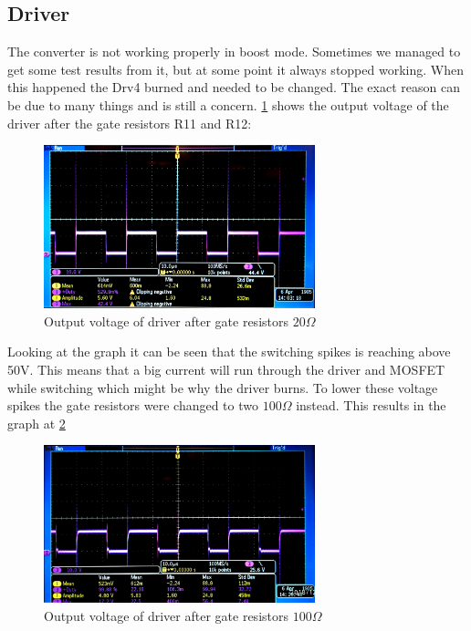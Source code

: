 \subsection{Driver}

The converter is not working properly in boost mode. Sometimes we managed to get some test results from it, but at some point it always stopped working. When this happened the Drv4 burned and needed to be changed. The exact reason can be due to many things and is still a concern. \ref{Voltagespike} shows the output voltage of the driver after the gate resistors R11 and R12:

\begin{figure}[H]
	\begin{center}
		\includegraphics[width=0.7\textwidth]{../Pictures/P1/Discussion/Voltagespike.jpg}
		\caption{Output voltage of driver after gate resistors $20\Omega$}
		\label{Voltagespike}
	\end{center}	
\end{figure}    

Looking at the graph it can be seen that the switching spikes is reaching above 50V. This means that a big current will run through the driver and MOSFET while switching which might be why the driver burns. To lower these voltage spikes the gate resistors were changed to two $100\Omega$ instead. This results in the graph at \ref{Voltagespike_100}

\begin{figure}[H]
	\begin{center}
		\includegraphics[width=0.7\textwidth]{../Pictures/P1/Discussion/Voltagespike_new_resistors.jpg}
		\caption{Output voltage of driver after gate resistors $100\Omega$}
		\label{Voltagespike_100}
	\end{center}	
\end{figure} 

